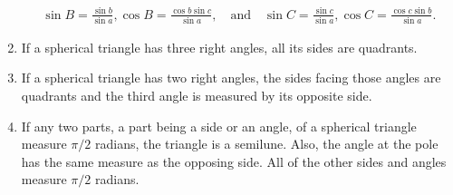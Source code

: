 \begin{tcolorbox}[title={Classification of Spherical Triangles}]
\begin{question}
\begin{enumerate}
        \begin{align*}
            \displaystyle\sin B=\frac{\sin b}{\sin a}, \cos B = \frac{\cos b \sin c}{\sin a},\quad \text{and} \quad \sin C=\frac{\sin c}{\sin a},\cos C = \frac{\cos c \sin b}{\sin a}.
        \end{align*}
        \item If a spherical triangle has three right angles, all its sides are quadrants.
        \item If a spherical triangle has two right angles, the sides facing those angles are quadrants and the third angle is measured by its opposite side.
        \item If any two parts, a part being a side or an angle, of a spherical triangle measure $\pi/2$ radians, the triangle is a semilune.
        Also, the angle at the pole has the same measure as the opposing side. All of the other sides and angles measure $\pi/2$ radians.
        \end{enumerate}
    \end{question}
\end{tcolorbox}


